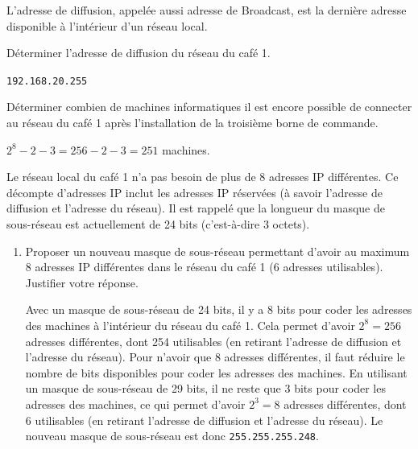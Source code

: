 \documentclass[11pt, a4paper]{report}
\begin{document}
    L'adresse de diffusion, appelée aussi adresse de Broadcast, est la dernière adresse disponible à l'intérieur d’un réseau local.
\begin{enumerate}[resume]

    \begin{minipage}{0.55\linewidth}
    \item Déterminer l'adresse de diffusion du réseau du café 1.
\end{minipage}\hfill
    \begin{minipage}{0.44\linewidth}
    \begin{blocvisible}[height=1]
        \verb|192.168.20.255|
        \end{blocvisible}
\end{minipage}

\begin{minipage}{0.55\linewidth}
    \item Déterminer combien de machines informatiques il est encore possible de connecter au réseau du café 1 après l'installation de la troisième borne de commande.
\end{minipage}\hfill
    \begin{minipage}{0.44\linewidth}
        \begin{blocvisible}[height=1]
            $2^8 - 2 - 3 = 256 - 2 - 3 = 251$ machines.
        \end{blocvisible}
    \end{minipage}
\end{enumerate}

\medskip

Le réseau local du café 1 n'a pas besoin de plus de 8 adresses IP différentes. Ce décompte d'adresses IP inclut les adresses IP réservées (à savoir l'adresse de diffusion et l'adresse du réseau). Il est rappelé que la longueur du masque de sous-réseau est actuellement de 24 bits (c'est-à-dire 3 octets).

\begin{enumerate}[resume]
\item Proposer un nouveau masque de sous-réseau permettant d'avoir au maximum 8 adresses IP différentes dans le réseau du café 1 (6 adresses utilisables). Justifier votre réponse.

        \begin{blocvisible}[height=4]
        Avec un masque de sous-réseau de 24 bits, il y a 8 bits pour coder les adresses des machines à l'intérieur du réseau du café 1. Cela permet d'avoir $2^8 = 256$ adresses différentes, dont 254 utilisables (en retirant l'adresse de diffusion et l'adresse du réseau). Pour n'avoir que 8 adresses différentes, il faut réduire le nombre de bits disponibles pour coder les adresses des machines. En utilisant un masque de sous-réseau de 29 bits, il ne reste que 3 bits pour coder les adresses des machines, ce qui permet d'avoir $2^3 = 8$ adresses différentes, dont 6 utilisables (en retirant l'adresse de diffusion et l'adresse du réseau). Le nouveau masque de sous-réseau est donc \verb|255.255.255.248|.

        \end{blocvisible}


\end{enumerate}
\end{document}
